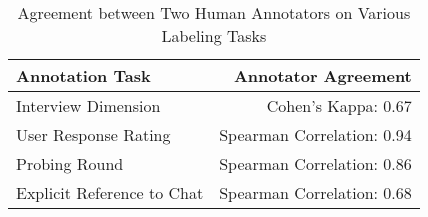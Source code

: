 \begin{table}[t]
\small
\centering
\caption{Agreement between Two Human Annotators on Various Labeling Tasks}\label{tab:annotator_agree} 
\vspace{-0.1cm}
\begin{tabular}{l|r}
\toprule
\textbf{Annotation Task} & \textbf{Annotator Agreement} \\ \hline
Interview Dimension & Cohen’s Kappa: 0.67\\
User Response Rating & Spearman Correlation: 0.94\\
Probing Round & Spearman Correlation: 0.86 \\
Explicit Reference to Chat & Spearman Correlation: 0.68\\
\bottomrule
\end{tabular}
\vspace{-0.3cm}
\end{table}

